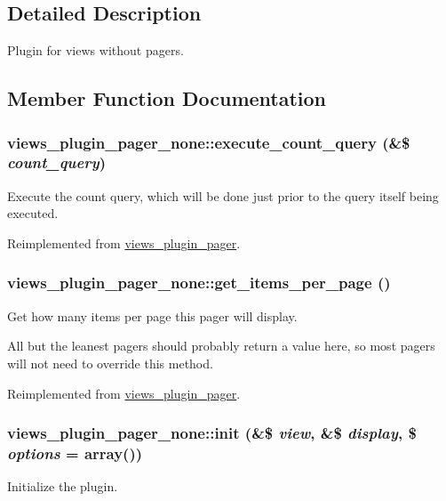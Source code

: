 \subsection{Detailed Description}
Plugin for views without pagers. 

\subsection{Member Function Documentation}
\hypertarget{classviews__plugin__pager__none_a7bcc11b430579941eadc1a797da2eda0}{
\subsubsection[{execute\_\-count\_\-query}]{\setlength{\rightskip}{0pt plus 5cm}views\_\-plugin\_\-pager\_\-none::execute\_\-count\_\-query (\&\$ {\em count\_\-query})}}
\label{classviews__plugin__pager__none_a7bcc11b430579941eadc1a797da2eda0}
Execute the count query, which will be done just prior to the query itself being executed. 

Reimplemented from \hyperlink{classviews__plugin__pager_a6d6e0ff79b5744f88a47d932ec68cfeb}{views\_\-plugin\_\-pager}.\hypertarget{classviews__plugin__pager__none_adbd6fa6434d0708b1e7dd49ff4e9f1d0}{
\subsubsection[{get\_\-items\_\-per\_\-page}]{\setlength{\rightskip}{0pt plus 5cm}views\_\-plugin\_\-pager\_\-none::get\_\-items\_\-per\_\-page ()}}
\label{classviews__plugin__pager__none_adbd6fa6434d0708b1e7dd49ff4e9f1d0}
Get how many items per page this pager will display.

All but the leanest pagers should probably return a value here, so most pagers will not need to override this method. 

Reimplemented from \hyperlink{classviews__plugin__pager_abdae5c9965b541f4b54fb7dae64bfc70}{views\_\-plugin\_\-pager}.\hypertarget{classviews__plugin__pager__none_a7d293fbd8b7b2a526c916ffd0bccc33a}{
\subsubsection[{init}]{\setlength{\rightskip}{0pt plus 5cm}views\_\-plugin\_\-pager\_\-none::init (\&\$ {\em view}, \/  \&\$ {\em display}, \/  \$ {\em options} = {\ttfamily array()})}}
\label{classviews__plugin__pager__none_a7d293fbd8b7b2a526c916ffd0bccc33a}
Initialize the plugin.


